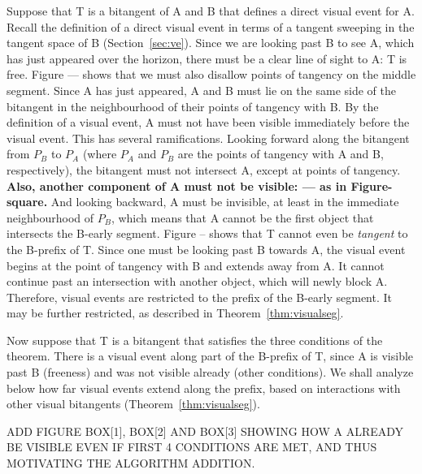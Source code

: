 \documentclass[12pt]{article}
\begin{document}
\prf
Suppose that T is a bitangent of A and B that defines a direct visual event for A.
Recall the definition of a direct visual event in terms of a tangent sweeping 
in the tangent space of B (Section~\ref{sec:ve}).
Since we are looking past B to see A, 
which has just appeared over the horizon,
there must be a clear line of sight to A: T is free.
Figure --- shows that we must also disallow points of tangency on the middle segment.
Since A has just appeared, 
A and B must lie on the same side of the bitangent in the neighbourhood
of their points of tangency with B.
By the definition of a visual event, A must not have been visible immediately
before the visual event.
This has several ramifications.
Looking forward along the bitangent from $P_B$ to $P_A$
(where $P_A$ and $P_B$ are the points of tangency with A and B, respectively),
the bitangent must not intersect A, except at points of tangency.
{\bf Also, another component of A must not be visible: --- as in Figure-square.}
And looking backward, A must be invisible, at least in the immediate neighbourhood
of $P_B$, which means that A cannot be the first object that intersects the B-early
segment.
Figure -- shows that T cannot even be {\em tangent} to the B-prefix of T.
Since one must be looking past B towards A,
the visual event begins at the point of tangency with B
and extends away from A.
It cannot continue past an intersection with another object, which will newly block A.
Therefore, visual events are restricted to the prefix of the B-early segment.
It may be further restricted, as described in Theorem~\ref{thm:visualseg}.

Now suppose that T is a bitangent that satisfies the three conditions of the theorem.
There is a visual event along part of the B-prefix of T,
since A is visible past B (freeness) and was not visible already (other conditions).
We shall analyze below how far visual events extend along the prefix,
based on interactions with other visual bitangents (Theorem~\ref{thm:visualseg}).
\QED

ADD FIGURE BOX[1], BOX[2] AND BOX[3] SHOWING HOW A ALREADY BE VISIBLE EVEN IF FIRST 4
CONDITIONS ARE MET, AND THUS MOTIVATING THE ALGORITHM ADDITION.

\end{document}
